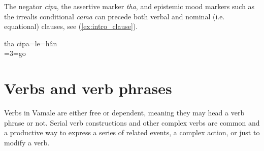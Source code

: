 %	
%	

The negator \textit{cipa}, the assertive marker \textit{tha}, and epistemic mood markers such as the irrealis conditional \textit{cama}  can precede both verbal and nominal (i.e. equational) clauses, see (\ref{ex:intro_clause}).

\ea \label{ex:intro_clause}
\gll tha cipa=le=hân\\
  =3=go\\
\glt {}
\z

\section{Verbs and verb phrases}

Verbs in Vamale are either free or dependent, meaning they may head a verb phrase or not. Serial verb constructions and other complex verbs are common and a productive way to express a series of related events, a complex action, or just to modify a verb.

